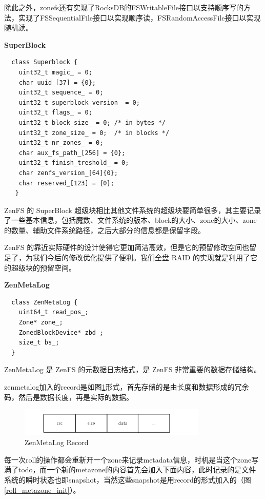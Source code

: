 除此之外，zonefs还有实现了RocksDB的FSWritableFile接口以支持顺序写的方法，实现了FSSequentialFile接口以实现顺序读，FSRandomAccessFile接口以实现随机读。

\textbf{SuperBlock}

\begin{lstlisting}
  class Superblock {
    uint32_t magic_ = 0;
    char uuid_[37] = {0};
    uint32_t sequence_ = 0;
    uint32_t superblock_version_ = 0;
    uint32_t flags_ = 0;
    uint32_t block_size_ = 0; /* in bytes */
    uint32_t zone_size_ = 0;  /* in blocks */
    uint32_t nr_zones_ = 0;
    char aux_fs_path_[256] = {0};
    uint32_t finish_treshold_ = 0;
    char zenfs_version_[64]{0};
    char reserved_[123] = {0};
   }  
\end{lstlisting}

ZenFS 的 SuperBlock 超级块相比其他文件系统的超级块要简单很多，其主要记录了一些基本信息，包括魔数、文件系统的版本、block的大小、zone的大小、zone的数量、辅助文件系统路径，之后大部分的信息都是保留字段。

ZenFS 的靠近实际硬件的设计使得它更加简洁高效，但是它的预留修改空间也留足了，为我们今后的修改优化提供了便利。我们全盘 RAID 的实现就是利用了它的超级块的预留空间。

\textbf{ZenMetaLog}

\begin{lstlisting}
  class ZenMetaLog {
    uint64_t read_pos_;
    Zone* zone_;
    ZonedBlockDevice* zbd_;
    size_t bs_;
  }  
\end{lstlisting}

ZenMetaLog 是 ZenFS 的元数据日志格式，是 ZenFS 非常重要的数据存储结构。

zenmetalog加入的record是如图\ref{meta_form}形式，首先存储的是由长度和数据形成的冗余码，然后是数据长度，再是实际的数据。

\begin{figure}[htbp]
  \centering
  \includegraphics[width=0.8\textwidth]{fig/meta_form}
  \caption{ZenMetaLog Record}
  \label{meta_form}
\end{figure}

每一次roll的操作都会重新开一个zone来记录metadata信息，时机是当这个zone写满了todo，而一个新的metazone的内容首先会加入下面内容，此时记录的是文件系统的瞬时状态也即snapshot，当然这些snapshot是用record的形式加入的（图\ref{roll_metazone_init}）。

